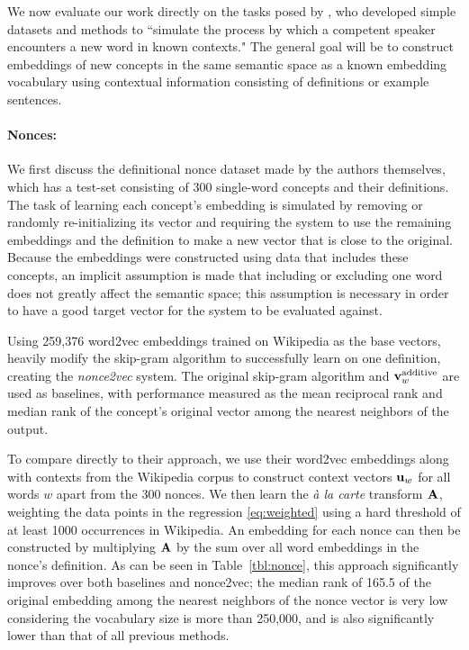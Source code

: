 \documentclass[11pt,a4paper]{article}
\begin{document}
We now evaluate our work directly on the tasks posed by \citet{Herbelot:17}, who developed simple datasets and methods to ``simulate the process by which a competent speaker encounters a new word in known contexts."
The general goal will be to construct embeddings of new concepts in the same semantic space as a known embedding vocabulary using contextual information consisting of definitions or example sentences.

\paragraph{Nonces:}
We first discuss the definitional nonce dataset made by the authors themselves, which has a test-set consisting of 300 single-word concepts and their definitions.
The task of learning each concept's embedding is simulated by removing or randomly re-initializing its vector and requiring the system to use the remaining embeddings and the definition to make a new vector that is close to the original.
Because the embeddings were constructed using data that includes these concepts, an implicit assumption is made that including or excluding one word does not greatly affect the semantic space;
this assumption is necessary in order to have a good target vector for the system to be evaluated against.

Using 259,376 word2vec embeddings trained on Wikipedia as the base vectors, \citet{Herbelot:17} heavily modify the skip-gram algorithm to successfully learn on one definition, creating the {\em nonce2vec} system.
The original skip-gram algorithm and ${\bf v}_w^\textrm{additive}$ are used as baselines, with performance measured as the mean reciprocal rank and median rank of the concept's original vector among the nearest neighbors of the output.

To compare directly to their approach, we use their word2vec embeddings along with contexts from the Wikipedia corpus to construct context vectors ${\bf u}_w$ for all words $w$ apart from the 300 nonces.
We then learn the {\em\`a la carte} transform ${\bf A}$, weighting the data points in the regression \eqref{eq:weighted} using a hard threshold of at least 1000 occurrences in Wikipedia. 
An embedding for each nonce can then be constructed by multiplying ${\bf A}$ by the sum over all word embeddings in the nonce's definition.
As can be seen in Table~\ref{tbl:nonce}, this approach significantly improves over both baselines and nonce2vec; 
the median rank of 165.5 of the original embedding among the nearest neighbors of the nonce vector is very low considering the vocabulary size is more than 250,000, and is also significantly lower than that of all previous methods.
\end{document}
